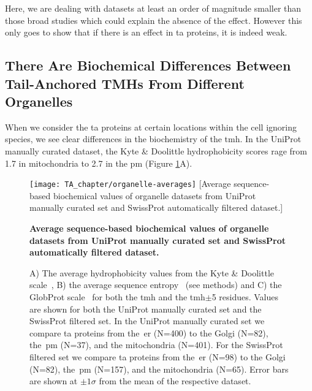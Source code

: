 Here, we are dealing with datasets at least an order of magnitude smaller than those broad studies which could explain the absence of the effect.
However this only goes to show that if there is an effect in \gls{ta} proteins, it is indeed weak.

\subsection{There Are Biochemical Differences Between Tail-Anchored TMHs From Different Organelles}

When we consider the \gls{ta} proteins at certain locations within the cell ignoring species, we see clear differences in the biochemistry of the \gls{tmh}.
In the UniProt manually curated dataset, the Kyte \& Doolittle hydrophobicity scores rage from 1.7 in mitochondria to 2.7 in the \gls{pm} (Figure \ref{fig:average_organelle_factors_ta}A).

\begin{figure}[!ht]
\centering
\texttt{[image: TA\_chapter/organelle-averages]}
[Average sequence-based biochemical values of organelle datasets from UniProt manually curated set and SwissProt automatically filtered dataset.]
{\textbf{Average sequence-based biochemical values of organelle datasets from UniProt manually curated set and SwissProt automatically filtered dataset.}

A) The average hydrophobicity values from the Kyte \& Doolittle scale~\cite{Kyte1982}, B) the average sequence entropy~\cite{Shannon1948} (see methods) and C) the GlobProt scale~\cite{Linding2003} for both the \gls{tmh} and the \gls{tmh}$\pm$5 residues.
Values are shown for both the UniProt manually curated set and the SwissProt filtered set.
In the UniProt manually curated set we compare \gls{ta} proteins from the~\gls{er} (N=400) to the Golgi (N=82), the~\gls{pm} (N=37), and the mitochondria (N=401).
For the SwissProt filtered set we compare \gls{ta} proteins from the~\gls{er} (N=98) to the Golgi (N=82), the~\gls{pm} (N=157), and the mitochondria (N=65).
Error bars are shown at $\pm 1 \sigma$ from the mean of the respective dataset.
}

\label{fig:average_organelle_factors_ta}
\end{figure}




